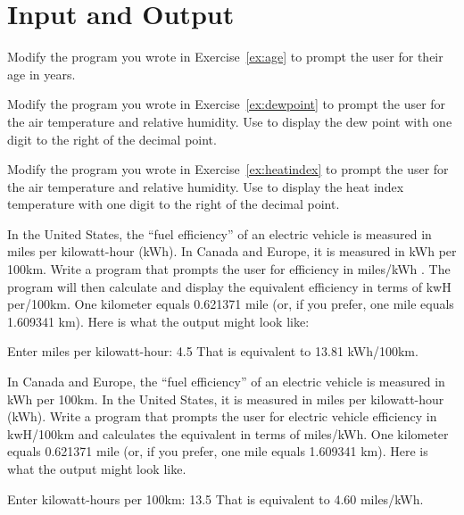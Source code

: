\chapter{Input and Output}

\begin{exercise}
Modify the program you wrote in Exercise~\ref{ex:age} to prompt the user for their age in years.
\end{exercise}

\begin{exercise}
\label{ex:dewpoint2}
Modify the program you wrote in Exercise~\ref{ex:dewpoint} to prompt the user for the air temperature and relative humidity. Use  to display the dew point with one digit to the right of the decimal point.
\end{exercise}

\begin{exercise}
Modify the program you wrote in Exercise~\ref{ex:heatindex} to prompt the user for the air temperature and relative humidity. Use  to display the heat index temperature with one digit to the right of the decimal point.
\end{exercise}

\begin{exercise}
\label{ex:electricvehicle1}
In the United States, the ``fuel efficiency'' of an electric vehicle is measured in miles per kilowatt-hour (kWh). In Canada and Europe, it is measured in kWh per 100km. Write a program that prompts the user for efficiency in miles/kWh . The program will then calculate and display the equivalent efficiency in terms of kwH per/100km. One kilometer equals 0.621371 mile (or, if you prefer, one mile equals 1.609341 km). Here is what the output might look like:

\begin{stdout}
Enter miles per kilowatt-hour: 4.5
That is equivalent to 13.81 kWh/100km.
\end{stdout}

\end{exercise}

\begin{exercise}
\label{ex:electricvehicle2}
In Canada and Europe, the ``fuel efficiency'' of an electric vehicle is measured in kWh per 100km. In the United States, it is measured in miles per kilowatt-hour (kWh).  Write a program that prompts the user for electric vehicle efficiency in kwH/100km and calculates the equivalent in terms of miles/kWh.  One kilometer equals 0.621371 mile (or, if you prefer, one mile equals 1.609341 km). Here is what the output might look like.

\begin{stdout}
Enter kilowatt-hours per 100km: 13.5
That is equivalent to 4.60 miles/kWh.
\end{stdout}
\end{exercise}


